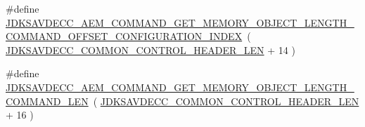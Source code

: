 \begin{DoxyCompactItemize}
\item 
\#define \hyperlink{group__command__get__memory__object__length_gabe138e86b95cb046f1710fc913918954}{J\+D\+K\+S\+A\+V\+D\+E\+C\+C\+\_\+\+A\+E\+M\+\_\+\+C\+O\+M\+M\+A\+N\+D\+\_\+\+G\+E\+T\+\_\+\+M\+E\+M\+O\+R\+Y\+\_\+\+O\+B\+J\+E\+C\+T\+\_\+\+L\+E\+N\+G\+T\+H\+\_\+\+C\+O\+M\+M\+A\+N\+D\+\_\+\+O\+F\+F\+S\+E\+T\+\_\+\+C\+O\+N\+F\+I\+G\+U\+R\+A\+T\+I\+O\+N\+\_\+\+I\+N\+D\+EX}~( \hyperlink{group__jdksavdecc__avtp__common__control__header_gaae84052886fb1bb42f3bc5f85b741dff}{J\+D\+K\+S\+A\+V\+D\+E\+C\+C\+\_\+\+C\+O\+M\+M\+O\+N\+\_\+\+C\+O\+N\+T\+R\+O\+L\+\_\+\+H\+E\+A\+D\+E\+R\+\_\+\+L\+EN} + 14 )
\item 
\#define \hyperlink{group__command__get__memory__object__length_gadecd0d8e632fe8a8f6bb6f28b059b0dd}{J\+D\+K\+S\+A\+V\+D\+E\+C\+C\+\_\+\+A\+E\+M\+\_\+\+C\+O\+M\+M\+A\+N\+D\+\_\+\+G\+E\+T\+\_\+\+M\+E\+M\+O\+R\+Y\+\_\+\+O\+B\+J\+E\+C\+T\+\_\+\+L\+E\+N\+G\+T\+H\+\_\+\+C\+O\+M\+M\+A\+N\+D\+\_\+\+L\+EN}~( \hyperlink{group__jdksavdecc__avtp__common__control__header_gaae84052886fb1bb42f3bc5f85b741dff}{J\+D\+K\+S\+A\+V\+D\+E\+C\+C\+\_\+\+C\+O\+M\+M\+O\+N\+\_\+\+C\+O\+N\+T\+R\+O\+L\+\_\+\+H\+E\+A\+D\+E\+R\+\_\+\+L\+EN} + 16 )
\end{DoxyCompactItemize}

